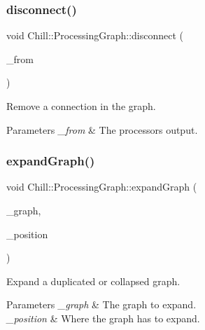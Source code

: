 \subsubsection{\texorpdfstring{disconnect()}{disconnect()}\hspace{0.1cm}{\footnotesize\ttfamily [2/2]}}
{\footnotesize\ttfamily void Chill\+::\+Processing\+Graph\+::disconnect (\begin{DoxyParamCaption}\item[{Auto\+Ptr$<$ \mbox{\hyperlink{class_chill_1_1_processor_output}{Processor\+Output}} $>$ \&}]{\+\_\+from }\end{DoxyParamCaption})\hspace{0.3cm}{\ttfamily [static]}}

Remove a connection in the graph. 
\begin{DoxyParams}{Parameters}
{\em \+\_\+from} & The processor\textquotesingle{}s output. \\
\hline
\end{DoxyParams}
\mbox{\label{class_chill_1_1_processing_graph_a7a7185106dc9e412a870915ee956bcca}} 
\subsubsection{\texorpdfstring{expand\+Graph()}{expandGraph()}}
{\footnotesize\ttfamily void Chill\+::\+Processing\+Graph\+::expand\+Graph (\begin{DoxyParamCaption}\item[{Auto\+Ptr$<$ \mbox{\hyperlink{class_chill_1_1_processing_graph}{Processing\+Graph}} $>$ \&}]{\+\_\+graph,  }\item[{Im\+Vec2}]{\+\_\+position }\end{DoxyParamCaption})}

Expand a duplicated or collapsed graph. 
\begin{DoxyParams}{Parameters}
{\em \+\_\+graph} & The graph to expand. \\
\hline
{\em \+\_\+position} & Where the graph has to expand. \\
\hline
\end{DoxyParams}
\mbox{\label{class_chill_1_1_processing_graph_a5a999e6f0f2af8d67e2c3d0afb393707}} 
